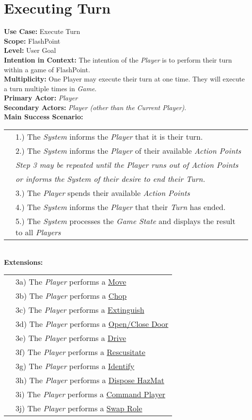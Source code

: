\documentclass{article}
\begin{document}
	\section*{Executing Turn}
	\textbf{Use Case:} Execute Turn\\
	\textbf{Scope:} FlashPoint\\
	\textbf{Level:} User Goal\\
	\textbf{Intention in Context: } The intention of the \textit{Player} is to perform their turn within a game of FlashPoint.\\
	\textbf{Multiplicity: } One Player may execute their turn at one time. They will execute a turn multiple times in \textit{Game}.\\
	\textbf{Primary Actor:} \textit{Player} \\
	\textbf{Secondary Actors:} \textit{Player (other than the Current Player)}.\\
	\textbf{Main Success Scenario:}\\
	\begin{tabular}{l l}
		&1.) The \textit{System} informs the \textit{Player} that it is their turn.\\
		&2.) The \textit{System} informs the \textit{Player} of their available \textit{Action Points}\\
		&\textit{Step 3 may be repeated until the Player runs out of Action Points}\\
		&\qquad \textit{or informs the System of their desire to end their Turn.}\\
		&3.) The \textit{Player} spends their available \textit{Action Points}\\
		&4.) The \textit{System} informs the \textit{Player} that their \textit{Turn} has ended.\\
		&5.) The \textit{System} processes the \textit{Game State} and displays the result to all \textit{Players}\\
	\end{tabular}\\
	\textbf{Extensions: }\\
	\begin{tabular}{l l}
		&3a) The \textit{Player} performs a \underline{Move}\\
		&3b) The \textit{Player} performs a \underline{Chop}\\
		&3c) The \textit{Player} performs a \underline{Extinguish}\\
		&3d) The \textit{Player} performs a \underline{Open/Close Door}\\
		&3e) The \textit{Player} performs a \underline{Drive}\\
		&3f) The \textit{Player} performs a \underline{Rescusitate}\\
		&3g) The \textit{Player} performs a \underline{Identify}\\
		&3h) The \textit{Player} performs a \underline{Dispose HazMat}\\
		&3i) The \textit{Player} performs a \underline{Command Player}\\
		&3j) The \textit{Player} performs a  \underline{Swap Role}\\
	\end{tabular}
	
\end{document}
